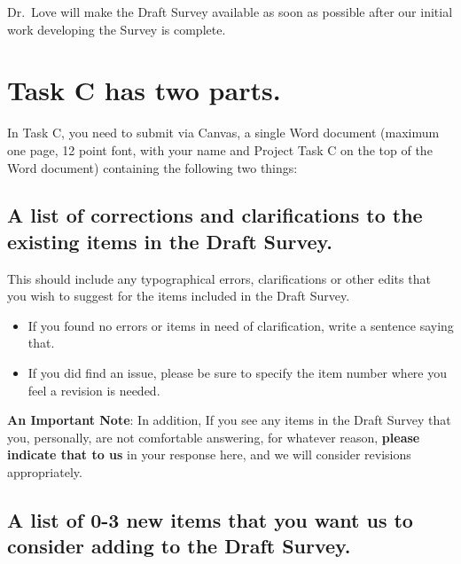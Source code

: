 \documentclass[]{book}
\providecommand{\tightlist}{%
  \setlength{\itemsep}{0pt}\setlength{\parskip}{0pt}}
\theoremstyle{definition}
\theoremstyle{definition}
\theoremstyle{definition}
\theoremstyle{remark}
\begin{document}
Dr.~Love will make the Draft Survey available as soon as possible after
our initial work developing the Survey is complete.

\hypertarget{task-c-has-two-parts.}{%
\section{Task C has two parts.}\label{task-c-has-two-parts.}}

In Task C, you need to submit via Canvas, a single Word document
(maximum one page, 12 point font, with your name and Project Task C on
the top of the Word document) containing the following two things:

\hypertarget{a-list-of-corrections-and-clarifications-to-the-existing-items-in-the-draft-survey.}{%
\subsection{A list of corrections and clarifications to the existing
items in the Draft
Survey.}\label{a-list-of-corrections-and-clarifications-to-the-existing-items-in-the-draft-survey.}}

This should include any typographical errors, clarifications or other
edits that you wish to suggest for the items included in the Draft
Survey.

\begin{itemize}
\tightlist
\item
  If you found no errors or items in need of clarification, write a
  sentence saying that.
\item
  If you did find an issue, please be sure to specify the item number
  where you feel a revision is needed.
\end{itemize}

\textbf{An Important Note}: In addition, If you see any items in the
Draft Survey that you, personally, are not comfortable answering, for
whatever reason, \textbf{please indicate that to us} in your response
here, and we will consider revisions appropriately.

\hypertarget{a-list-of-0-3-new-items-that-you-want-us-to-consider-adding-to-the-draft-survey.}{%
\subsection{A list of 0-3 new items that you want us to consider adding
to the Draft
Survey.}\label{a-list-of-0-3-new-items-that-you-want-us-to-consider-adding-to-the-draft-survey.}}
\end{document}
